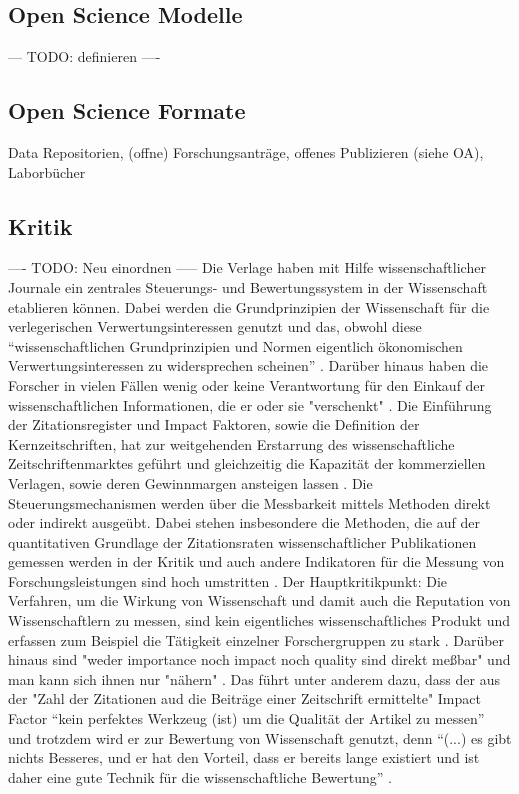 \subsection{Open Science Modelle}
--- TODO: definieren ----
\subsection{Open Science Formate}
Data Repositorien, (offne) Forschungsanträge, offenes Publizieren (siehe OA), Laborbücher



\subsection{Kritik}
---- TODO: Neu einordnen -----
Die Verlage haben mit Hilfe wissenschaftlicher Journale ein zentrales Steuerungs- und Bewertungssystem in der Wissenschaft etablieren können. Dabei werden die Grundprinzipien der Wissenschaft für die verlegerischen Verwertungsinteressen genutzt und das, obwohl diese “wissenschaftlichen Grundprinzipien und Normen eigentlich ökonomischen Verwertungsinteressen zu widersprechen scheinen” \cite{hanekop_2006}. Darüber hinaus haben die Forscher in vielen Fällen wenig oder keine Verantwortung für den Einkauf der wissenschaftlichen Informationen, die er oder sie "verschenkt" \cite{steele_2006}. Die Einführung der Zitationsregister und Impact Faktoren, sowie die Definition der Kernzeitschriften, hat zur weitgehenden Erstarrung des wissenschaftliche Zeitschriftenmarktes geführt und gleichzeitig die Kapazität der kommerziellen Verlagen, sowie deren Gewinnmargen ansteigen lassen \cite{CREATe_2014}. Die Steuerungsmechanismen werden über die Messbarkeit mittels Methoden direkt oder indirekt ausgeübt. Dabei stehen insbesondere die Methoden, die auf der quantitativen Grundlage der Zitationsraten wissenschaftlicher Publikationen gemessen werden in der Kritik \cite{Dong_2005} und auch andere Indikatoren für die Messung von Forschungsleistungen sind hoch umstritten \cite{Hornbostel_1997} \cite{Hicks_1996} \cite{Havemann_2002}. Der Hauptkritikpunkt: Die Verfahren, um die Wirkung von Wissenschaft und damit auch die Reputation von Wissenschaftlern zu messen, sind kein eigentliches wissenschaftliches Produkt\cite{suchen} und erfassen zum Beispiel die Tätigkeit einzelner Forschergruppen zu stark \cite{schmoch_2009}. Darüber hinaus sind "weder importance noch impact noch quality sind direkt meßbar" und man kann sich ihnen nur "nähern" \cite{Hornbostel_1997}. Das führt unter anderem dazu, dass der aus der "Zahl der Zitationen aud die Beiträge einer Zeitschrift ermittelte" \cite{weishaupt_2009_goldenOA} Impact Factor “kein perfektes Werkzeug (ist) um die Qualität der Artikel zu messen” und trotzdem wird er zur Bewertung von Wissenschaft genutzt, denn “(...) es gibt nichts Besseres, und er hat den Vorteil, dass er bereits lange existiert und ist daher eine gute Technik für die wissenschaftliche Bewertung”\cite{garfield_1999} \cite{weishaupt_2009_goldenOA}. 

